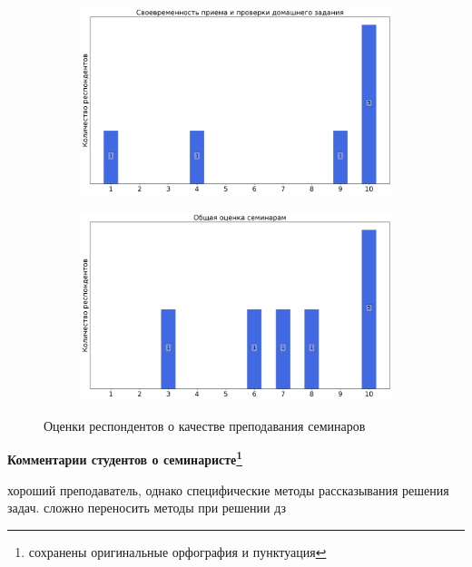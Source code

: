 \begin{figure}[H]
\begin{subfigure}[b]{0.45\textwidth}
                \includegraphics[width=\textwidth]{images/2 course/Кратные интегралы и теория поля/seminarists-marks-Черняев А.В.-2.png}
            \end{subfigure}
            \begin{subfigure}[b]{0.45\textwidth}
                \centering
                \includegraphics[width=\textwidth]{images/2 course/Кратные интегралы и теория поля/seminarists-marks-Черняев А.В.-3.png}
            \end{subfigure}	
            \caption{Оценки респондентов о качестве преподавания семинаров}
        \end{figure}

        \textbf{Комментарии студентов о семинаристе\protect\footnote{сохранены оригинальные орфография и пунктуация}}
            \begin{commentbox} 
                хороший преподаватель, однако специфические методы рассказывания решения задач. сложно переносить методы при решении дз 
            \end{commentbox} 
        
